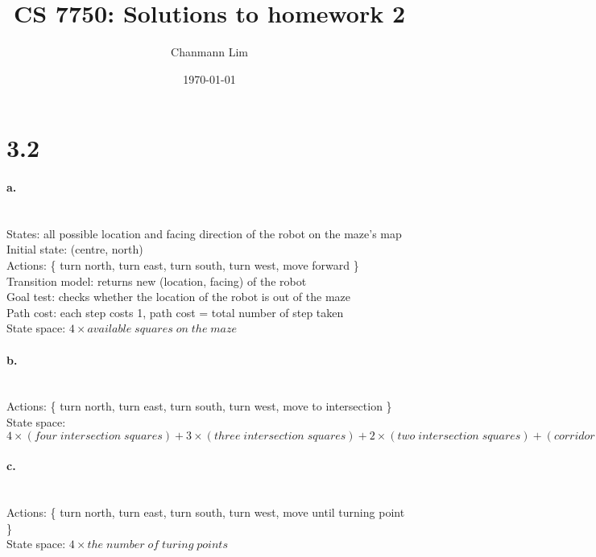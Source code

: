 \documentclass[a4paper]{article}
\begin{document}
\title{CS 7750: Solutions to homework 2}
\author{Chanmann Lim}
\date{\today}
\maketitle

\section*{3.2}

\paragraph{a.} ~\\
\indent States: all possible location and facing direction of the robot on the maze's map \\
\indent Initial state: (centre, north) \\
\indent Actions: \{ turn north, turn east, turn south, turn west, move forward \} \\
\indent Transition model: returns new (location, facing) of the robot  \\
\indent Goal test: checks whether the location of the robot is out of the maze \\
\indent Path cost: each step costs 1, path cost = total number of step taken \\

\indent State space: $4 \times available \; squares \; on \; the \; maze$

\paragraph{b.} ~\\
\indent Actions: \{ turn north, turn east, turn south, turn west, move to intersection \} \\
\indent State space: $4 \times (four \; intersection \; squares) + 3 \times (three \; intersection \; squares) + 2 \times (two \; intersection \; squares) + (corridor \; without \; intersection \; squares)$

\paragraph{c.} ~\\
\indent Actions: \{ turn north, turn east, turn south, turn west, move until turning point \} \\
\indent State space: $4 \times the \; number \; of \; turing \; points$ \\
\end{document}
